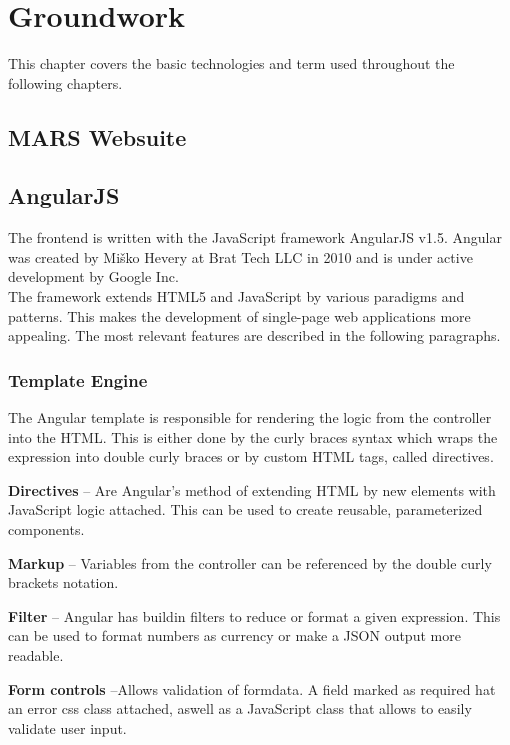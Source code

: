 
\chapter{Groundwork}
This chapter covers the basic technologies and term used throughout the following chapters.


\section{MARS Websuite}



\section{AngularJS}
\label{sec:angularjs}
The frontend is written with the JavaScript framework AngularJS v1.5. Angular was created by Miško Hevery at Brat Tech LLC in 2010 and is under active development by Google Inc. \\
The framework extends HTML5 and JavaScript by various paradigms and patterns. This makes the development of single-page web applications more appealing. The most relevant features are described in the following paragraphs.


\subsection{Template Engine}
The Angular template is responsible for rendering the logic from the controller into the HTML. This is either done by the curly braces syntax which wraps the expression into double curly braces or by custom HTML tags, called directives.\vspace{1ex}

\noindent\textbf{Directives} -- Are Angular's method of extending HTML by new elements with JavaScript logic attached. This can be used to create reusable, parameterized components.

\noindent\textbf{Markup} -- Variables from the controller can be referenced by the double curly brackets notation.

\noindent\textbf{Filter} -- Angular has buildin filters to reduce or format a given expression. This can be used to format numbers as currency or make a JSON output more readable.

\noindent\textbf{Form controls} --Allows validation of formdata. A field marked as required hat an error css class attached, aswell as a JavaScript class that allows to easily validate user input.\vspace{1ex}

